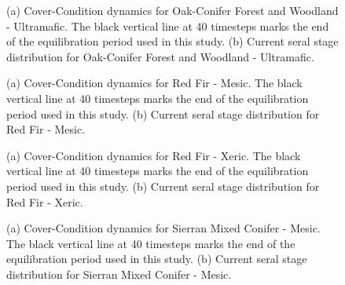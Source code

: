 \begin{figure}[!htbp]
  \centering
  \caption{(a) Cover-Condition dynamics for Oak-Conifer Forest and Woodland - Ultramafic. The black vertical line at 40 timesteps marks the end of the equilibration period used in this study. (b) Current seral stage distribution for Oak-Conifer Forest and Woodland - Ultramafic.} 
  \label{fig:covcond_ocfwu}
\end{figure}

\begin{figure}[!htbp]
  \centering
  \caption{(a) Cover-Condition dynamics for Red Fir - Mesic. The black vertical line at 40 timesteps marks the end of the equilibration period used in this study. (b) Current seral stage distribution for Red Fir - Mesic.} 
  \label{fig:covcond_rfrm}
\end{figure}

\begin{figure}[!htbp]
  \centering
  \caption{(a) Cover-Condition dynamics for Red Fir - Xeric. The black vertical line at 40 timesteps marks the end of the equilibration period used in this study. (b) Current seral stage distribution for Red Fir - Xeric.} 
  \label{fig:covcond_rfrx}
\end{figure}

\begin{figure}[!htbp]
  \centering
  \caption{(a) Cover-Condition dynamics for Sierran Mixed Conifer - Mesic. The black vertical line at 40 timesteps marks the end of the equilibration period used in this study. (b) Current seral stage distribution for Sierran Mixed Conifer - Mesic.} 
  \label{fig:covcond_smcm_app}
\end{figure}


